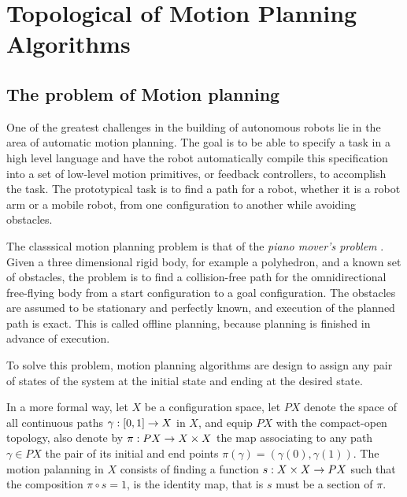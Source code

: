 \chapter{Topological of Motion Planning Algorithms}

\section{The problem of Motion planning}

One of the greatest challenges in the building of autonomous robots lie in the area of automatic motion planning. The goal is to be able to specify a task in a high level language and have the robot automatically compile this specification into a set of low-level motion primitives, or feedback controllers, to accomplish the task. The prototypical task is to find a path for a robot, whether it is a robot arm or a mobile robot, from one configuration to another while avoiding obstacles.

The classsical motion planning problem is that of the \textit{piano mover's problem} \cite{schwartz:1983a}. Given a three dimensional rigid body, for example a polyhedron, and a known set of obstacles, the problem is to find a collision-free path for the omnidirectional free-flying body from a start configuration to a goal configuration. The obstacles are assumed to be stationary and perfectly known, and execution of the planned path is exact. This is called offline planning, because planning is finished in advance of execution. 


To solve this problem, motion planning algorithms are design to assign any pair of states of the system at the initial state and ending at the desired state.

In a more formal way, let $X$ be a configuration space, let $PX$ denote the space of all continuous paths $\displaystyle \gamma : [0,1] \rightarrow X$ in $X$, and equip $PX$ with the compact-open topology, also denote by $\pi : PX \rightarrow X \times X$ the map associating to any path $\gamma \in PX$ the pair of its initial and end points $\pi(\gamma) = (\gamma(0), \gamma(1))$. The motion palanning in $X$ consists of finding a function $s : X \times X \rightarrow PX$ such that the composition $\pi \circ s = 1$, is the identity map, that is $s$ must be a section of $\pi$.

